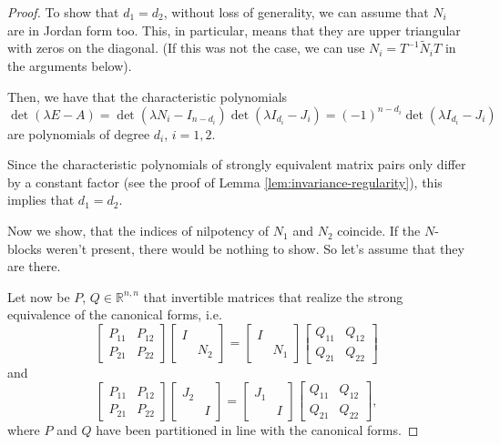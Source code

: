 \documentclass[]{book}
\theoremstyle{definition}
\theoremstyle{definition}
\theoremstyle{definition}
\theoremstyle{definition}
\theoremstyle{remark}
\begin{document}
\begin{proof}
{}To show that \(d_1=d_2\), without loss of generality, we can assume that \(N_i\) are in Jordan form too. This, in particular, means that they are upper triangular with zeros on the diagonal. (If this was not the case, we can use \(N_i = T^{-1}\tilde N_i T\) in the arguments below).

Then, we have that the characteristic polynomials
\[
\det (\lambda E - A) = \det (\lambda N_i-I_{n-d_i})\det (\lambda I_{d_i} - J_i) = (-1)^{n-d_i}\det (\lambda I_{d_i} - J_i)
\]
are polynomials of degree \(d_i\), \(i=1,2\).

Since the characteristic polynomials of strongly equivalent matrix pairs only differ by a constant factor (see the proof of Lemma \ref{lem:invariance-regularity}), this implies that \(d_1=d_2\).

Now we show, that the indices of nilpotency of \(N_1\) and \(N_2\) coincide. If the \(N\)-blocks weren't present, there would be nothing to show. So let's assume that they are there.

Let now be \(P\), \(Q \in \mathbb R^{n,n}\) that invertible matrices that realize the strong equivalence of the canonical forms, i.e.
\begin{equation}
\label{eq:equiv-wcf-i}
\begin{bmatrix}
P_{11} & P_{12} \\
P_{21} & P_{22}
\end{bmatrix}
\begin{bmatrix}
I \\
& N_2
\end{bmatrix}
=
\begin{bmatrix}
I \\
& N_1 
\end{bmatrix}
\begin{bmatrix}
Q_{11} & Q_{12} \\
Q_{21} & Q_{22}
\end{bmatrix}
\end{equation}
and
\begin{equation}
\label{eq:equiv-wcf-ii}
\begin{bmatrix}
P_{11} & P_{12} \\
P_{21} & P_{22}
\end{bmatrix}
\begin{bmatrix}
J_2 \\
& I 
\end{bmatrix}
=
\begin{bmatrix}
J_1 \\
& I 
\end{bmatrix}
\begin{bmatrix}
Q_{11} & Q_{12} \\
Q_{21} & Q_{22}
\end{bmatrix},
\end{equation}
where \(P\) and \(Q\) have been partitioned in line with the canonical forms.


\end{proof}
\end{document}
